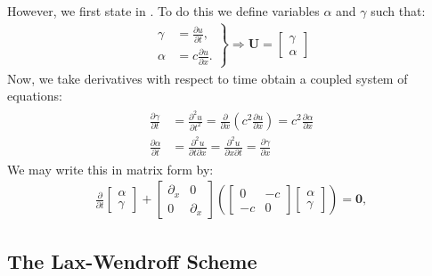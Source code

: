 \documentclass[../main.tex]{subfiles}
\begin{document}
\noindent However, we first state \label{eq:wave} in . To do this we define variables $\alpha$ and $\gamma$ such that:
\begin{gather*}
    \left.
    \begin{aligned}
        \gamma &= \frac{\partial u}{\partial t},\\
        \alpha &= c\frac{\partial u}{\partial x}.
    \end{aligned}
    \right\}
    \Rightarrow
    \mathbf{U} = \begin{bmatrix} \gamma \\ \alpha\end{bmatrix}
\end{gather*}
Now, we take derivatives with respect to time obtain a coupled system of equations:
\begin{gather*}
    \begin{aligned}
        \frac{\partial \gamma}{\partial t} &= \frac{\partial^2 u}{\partial t^2} = \frac{\partial}{\partial x}\left( c^2 \frac{\partial u}{\partial x}\right) = c^2 \frac{\partial \alpha}{\partial x}\\
        \frac{\partial \alpha}{\partial t} &= \frac{\partial^2 u}{\partial t \partial x} = \frac{\partial^2 u}{\partial x \partial t} = \frac{\partial \gamma}{\partial x}
    \end{aligned}
\end{gather*}
We may write this in matrix form by:
\begin{gather*}
\frac{\partial }{\partial t}
\begin{bmatrix}
\alpha \\ \gamma
\end{bmatrix}
+
\begin{bmatrix}
\partial_x & 0\\
0 & \partial_x 
\end{bmatrix}
\left(
\begin{bmatrix}
0 & -c\\
-c & 0
\end{bmatrix}
\begin{bmatrix}
\alpha \\
\gamma
\end{bmatrix}
\right)
=
\mathbf{0},
\end{gather*}

\subsection{The Lax-Wendroff Scheme}
\end{document}
